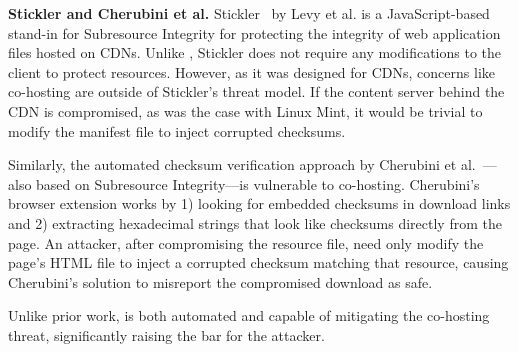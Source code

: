 \noindent\textbf{Stickler and Cherubini et al.} Stickler~\cite{Stickler} by Levy
et al. is a JavaScript-based stand-in for Subresource Integrity for protecting
the integrity of web application files hosted on CDNs. Unlike \SYSTEM{},
Stickler does not require any modifications to the client to protect resources.
However, as it was designed for CDNs, concerns like co-hosting are outside of
Stickler's threat model. If the content server behind the CDN is compromised, as
was the case with Linux Mint, it would be trivial to modify the manifest file to
inject corrupted checksums.

Similarly, the automated checksum verification approach by Cherubini et
al.~\cite{Cherubini}---also based on Subresource Integrity---is vulnerable to
co-hosting. Cherubini's browser extension works by 1) looking for embedded
checksums in download links and 2) extracting hexadecimal strings that look like
checksums directly from the page. An attacker, after compromising the resource
file, need only modify the page's HTML file to inject a corrupted checksum
matching that resource, causing Cherubini's solution to misreport the
compromised download as safe.

Unlike prior work, \SYSTEM{} is both automated and capable of mitigating the
co-hosting threat, significantly raising the bar for the attacker.
